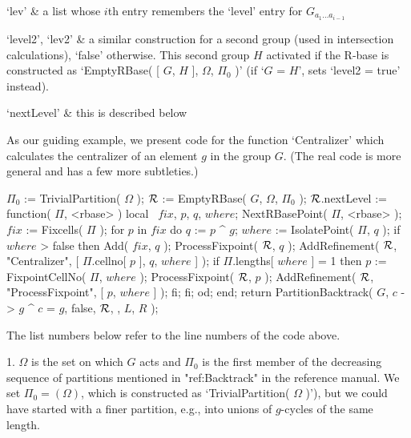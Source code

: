 `lev' &
    a  list   whose  $i$th  entry   remembers   the  `level' entry    for
    $G_{a_1\ldots a_{i-1}}$

`level2', `lev2' &
    a similar  construction   for a second  group  (used  in intersection
    calculations), `false' otherwise.  This second group $H$ activated if
    the R-base  is constructed as  `EmptyRBase(  [ $G$, $H$  ], $\Omega$,
    $\Pi_0$ )' (if `$G$ = $H$', {\GAP} sets `level2 = true' instead).

`nextLevel' &
    this is described below
\enditems

As  our guiding example, we  present  code for the function `Centralizer'
which calculates the centralizer of an element $g$ in the group $G$. (The
real code is more general and has a few more subtleties.)

\) $\Pi_0$ := TrivialPartition( $\Omega$ );
\) ${\cal R}$ := EmptyRBase( $G$, $\Omega$, $\Pi_0$ );
\) ${\cal R}$.nextLevel := function( $\Pi$, <rbase> )
\) local \ $fix$,  $p$,  $q$,  $where$;
\) \quad NextRBasePoint( $\Pi$, <rbase> );
\) \quad $fix$ := Fixcells( $\Pi$ );
\) \quad for $p$  in $fix$  do
\) \qquad $q$ := $p$ ^ $g$;
\) \qquad $where$ := IsolatePoint( $\Pi$, $q$ );
\) \qquad if $where$ \<> false  then
\) \quad\qquad Add( $fix$, $q$ );
\) \quad\qquad ProcessFixpoint( ${\cal R}$, $q$ );
\) \quad\qquad AddRefinement( ${\cal R}$, "Centralizer", %
              [ $\Pi$.cellno[ $p$ ], $q$, $where$ ] );
\) \quad\qquad if $\Pi$.lengths[ $where$ ] = 1  then
\) \qquad\qquad $p$ := FixpointCellNo( $\Pi$, $where$ );
\) \qquad\qquad ProcessFixpoint( ${\cal R}$, $p$ );
\) \qquad\qquad AddRefinement( ${\cal R}$, "ProcessFixpoint", %
              [ $p$, $where$ ] );
\) \quad\qquad fi;
\) \qquad fi;
\) \quad od;
\) end;
\) return PartitionBacktrack(
\) \qquad $G$,
\) \qquad $c$ -> $g$ ^ $c$ = $g$,
\) \qquad false,
\) \qquad ${\cal R}$,
\) \qquad [ $\Pi_0$, $g$ ],
\) \qquad $L$, $R$ );

The list numbers below refer to the line numbers of the code above.

\beginlist%

\item{1.}
$\Omega$ is the set on which $G$ acts and $\Pi_0$ is the first member  of
the decreasing sequence of partitions mentioned in "ref:Backtrack" in the
reference manual.  We  set  $\Pi_0=(\Omega)$,  which  is  constructed  as
`TrivialPartition( $\Omega$ )'), but we could have started with  a  finer
partition, e.g., into unions of $g$-cycles of the same length.

